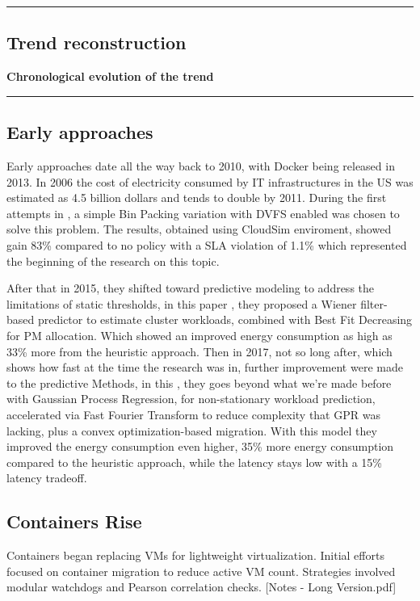 {\color{gray}\hrule}
\begin{center}
\section{Trend reconstruction}
\textbf{Chronological evolution of the trend}
\bigskip
\end{center}
{\color{gray}\hrule}
\begin{multicols}{2}
\subsection{Early approaches}
Early approaches date all the way back to 2010, with Docker being released in 2013. In 2006 the cost of electricity consumed by IT infrastructures in the US was estimated as 4.5 billion dollars and tends to double by 2011\cite{beloglazov_energy_2010}.
During the first attempts in \cite{beloglazov_energy_2010}, a simple Bin Packing variation with DVFS enabled was chosen to solve this problem. The results, obtained using CloudSim enviroment, showed  gain 83\% compared to no policy with a SLA violation of 1.1\% which represented the beginning of the research on this topic.

After that in 2015, they shifted toward predictive modeling to address the limitations of static thresholds, in this paper \cite{dabbagh_energy-efficient_2015},
they proposed a Wiener filter-based predictor to estimate cluster workloads, combined with Best Fit Decreasing for PM allocation. Which showed an improved energy consumption as high as 33\% more from the heuristic approach. 
Then in 2017, not so long after, which shows how fast at the time the research was in, further improvement were made to the predictive Methods, in this \cite{bui_energy_2017},
they goes beyond what we're made before with Gaussian Process Regression, for non-stationary workload prediction, accelerated via Fast Fourier Transform to reduce complexity that GPR was lacking, plus a convex optimization-based migration. With this model they improved the energy consumption even higher, 35\% more energy consumption compared to the heuristic approach, while the latency stays low with a 15\% latency tradeoff.


\subsection{Containers Rise}
Containers began replacing VMs for lightweight virtualization. Initial efforts focused on container migration to reduce active VM count. Strategies involved modular watchdogs and Pearson correlation checks. [Notes - Long Version.pdf]


\end{multicols}
